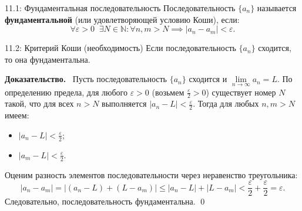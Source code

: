 \documentclass[a4paper,12pt]{article}
\newcommand{\myproof}{\textbf{Доказательство.}\ }
\begin{document}
	\begin{definitionbox}{11.1: Фундаментальная последовательность}
		Последовательность $\{a_n\}$ называется \textbf{фундаментальной} (или удовлетворяющей условию Коши), если:
		\[ \forall \varepsilon > 0 \;\; \exists N \in \mathbb{N} \colon \forall n, m > N \implies |a_n - a_m| < \varepsilon. \]
	\end{definitionbox}
	
	\begin{center}
	\end{center}
	
	\vspace{0.5cm}
	\begin{theorembox}{11.2: Критерий Коши (необходимость)}
		Если последовательность $\{a_n\}$ сходится, то она фундаментальна.
	\end{theorembox}
	
	\vspace{0.5cm}
	\myproof
	Пусть последовательность $\{a_n\}$ сходится и $\lim\limits_{n \to \infty} a_n = L$.
	По определению предела, для любого $\varepsilon > 0$ (возьмем $\frac{\varepsilon}{2} > 0$) существует номер $N$ такой, что для всех $n > N$ выполняется $|a_n - L| < \frac{\varepsilon}{2}$.
	Тогда для любых $n, m > N$ имеем:
	\begin{itemize}
		\item $|a_n - L| < \frac{\varepsilon}{2}$;
		\item $|a_m - L| < \frac{\varepsilon}{2}$.
	\end{itemize}
	Оценим разность элементов последовательности через неравенство треугольника:
	\[ |a_n - a_m| = |(a_n - L) + (L - a_m)| \le |a_n - L| + |L - a_m| < \frac{\varepsilon}{2} + \frac{\varepsilon}{2} = \varepsilon. \]
	Следовательно, последовательность фундаментальна. \qed
	
\end{document}
